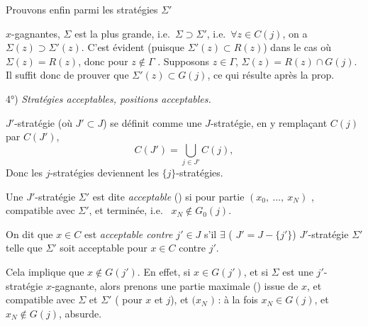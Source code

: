 \documentclass[11pt,a4paper]{article}
\begin{document}
Prouvons enfin  parmi les stratégies $\Sigma'$

\uncertain{$\Gamma$-}$x$-gagnantes,  $\Sigma$ est la plus grande, i.e.\ $\Sigma\supset\Sigma'$, i.e.\ $\forall z\in C(j)$, on a
$\Sigma(z)\supset\Sigma'(z)$. C'est évident (puisque $\Sigma'(z)\subset R(z)$) \struck{$\Sigma$} dans le cas où $\Sigma(z)=R(z)$, donc pour \struck{\ill{}} $z\notin\Gamma$ . Supposons  $z\in\Gamma$,  $\Sigma(z)=R(z)\cap G(j)$. Il suffit donc de prouver que $\Sigma'(z)\subset G(j)$, \struck{\ill{}} ce qui résulte  après la prop.


4°) \emph{Stratégies acceptables, positions acceptables.}

$J'$-stratégie (où $J'\subset J$) se définit comme une $J$-stratégie, en y remplaçant $C(j)$ par $C(J')$,
\[
  C(J')=\bigcup_{j\in J'}C(j),
\]
Donc les $j$-stratégies deviennent les $\{j\}$-stratégies.

Une \struck{\ill{}} $J'$-stratégie  $\Sigma'$ est dite \emph{acceptable} ()  si pour  partie $(x_0,\ \ldots,\ x_N)$ , compatible avec $\Sigma'$, et terminée, \ill{} i.e.\ \ill{} $x_N\notin G_0(j)$.


On dit que $x\in C$ \struck{\ill{}} est \emph{acceptable contre $j'\in J$}  s'il $\exists$ ( $J'=J-\{j'\}$) $J'$-stratégie $\Sigma'$ telle que $\Sigma'$ soit acceptable pour $x\in C$ contre $j'$.

Cela implique que $x\notin G(j')$. \struck{\ill{}} En effet, si $x\in G(j')$, et si $\Sigma$ est une $j'$-stratégie $x$-gagnante, alors prenons une partie maximale (\ill{}) issue de $x$, et compatible avec $\Sigma$ et $\Sigma'$ (\ill{} pour $x$ et $j$), et $(x_N$ $)$ : à la fois $x_N\in G(j)$, et $x_N\notin G(j)$, absurde.
\end{document}
